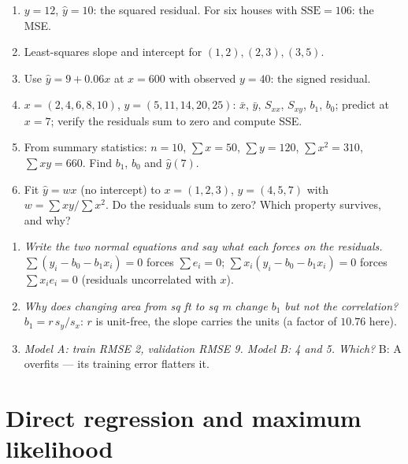 \documentclass[11pt]{article}
\begin{document}
\begin{tryit}
\begin{enumerate}[label=\textbf{E18.\arabic*}]
  \item $y = 12$, $\hat y = 10$: the squared residual. For six houses with
    $\mathrm{SSE} = 106$: the MSE.
  \item Least-squares slope and intercept for $(1,2), (2,3), (3,5)$.
  \item Use $\hat y = 9 + 0.06x$ at $x = 600$ with observed $y = 40$: the signed
    residual.
  \item $x = (2, 4, 6, 8, 10)$, $y = (5, 11, 14, 20, 25)$: $\bar x$, $\bar y$,
    $S_{xx}$, $S_{xy}$, $b_1$, $b_0$; predict at $x = 7$; verify the residuals
    sum to zero and compute SSE.
  \item From summary statistics: $n = 10$, $\sum x = 50$, $\sum y = 120$,
    $\sum x^2 = 310$, $\sum xy = 660$. Find $b_1$, $b_0$ and $\hat y(7)$.
  \item Fit $\hat y = wx$ (no intercept) to $x = (1, 2, 3)$, $y = (4, 5, 7)$
    with $w = \sum xy/\sum x^2$. Do the residuals sum to zero? Which property
    survives, and why?
\end{enumerate}
\end{tryit}

\begin{concept}
\begin{enumerate}[label=\textbf{C18.\arabic*}]
  \item \emph{Write the two normal equations and say what each forces on the
    residuals.} $\sum(y_i - b_0 - b_1x_i) = 0$ forces $\sum e_i = 0$;
    $\sum x_i(y_i - b_0 - b_1x_i) = 0$ forces $\sum x_ie_i = 0$ (residuals
    uncorrelated with $x$).
  \item \emph{Why does changing area from sq ft to sq m change $b_1$ but not
    the correlation?} $b_1 = r\,s_y/s_x$: $r$ is unit-free, the slope carries
    the units (a factor of $10.76$ here).
  \item \emph{Model A: train RMSE 2, validation RMSE 9. Model B: 4 and 5.
    Which?} B: A overfits --- its training error flatters it.
\end{enumerate}
\end{concept}
\section{Direct regression and maximum likelihood}
\label{sec:mle}
\end{document}
